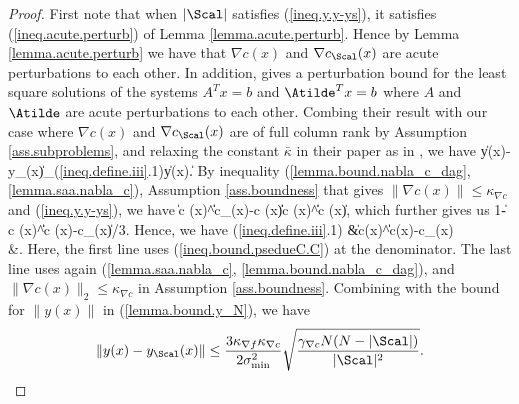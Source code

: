 \begin{proof}
First note that when $|\Scal|$ satisfies (\ref{ineq.y.y-ys}), it satisfies (\ref{ineq.acute.perturb}) of Lemma \ref{lemma.acute.perturb}. Hence by Lemma \ref{lemma.acute.perturb} we have that $\nabla c (x)$ and $\nabla c_\Scal(x)$ are acute perturbations to each other. In addition, \cite[Theorem 5.2]{396bf6e1-ef54-3bf6-a49b-862db8404076} gives a perturbation bound for the least square solutions of the systems $A^Tx=b$ and $\Atilde^T x=b$ where $A$ and $\Atilde$ are acute perturbations to each other. Combing their result with our case where $\nabla c(x)$ and $\nabla c_\Scal(x)$ are of full column rank by Assumption \ref{ass.subproblems}, and relaxing the constant $\bar{\kappa}$ in their paper as in \cite[Corollary 3.9]{396bf6e1-ef54-3bf6-a49b-862db8404076}, we have
\bequation
\label{ineq.define.iii}
	\|y(x)-y_\Scal(x)\|
	\le {}_{(\ref{ineq.define.iii}.1)}\|y(x)\|.
\eequation
	By inequality (\ref{lemma.bound.nabla_c_dag},\ref{lemma.saa.nabla_c}), Assumption \ref{ass.boundness} that gives $\|\nabla c(x)\|\le\kappa_{\nabla c}$ and (\ref{ineq.y.y-ys}), we have
	\bequationNN
	\|\nabla c (x)^\dag\|\|\nabla c_\Scal(x)-\nabla c (x)\|
	\le{}\|\nabla c (x)^\dag\|\|\nabla c (x)\|\le {},
	\eequationNN
which further gives us
	\bequation
	\label{ineq.bound.psedueC.C}
		1-\|\nabla c (x)^\dag\|\|\nabla c (x)-\nabla c_\Scal(x)\|/3.
	\eequation
	Hence, we have
	\bequationNN
	\label{ineq.bound.psi}
	\baligned
	(\ref{ineq.define.iii}.1)
	&\le {}\|\nabla c(x)^\dag\|\|\nabla c(x)-\nabla c_\Scal(x)\|\\
	&\le {}.
\ealigned
\eequationNN
Here, the first line uses (\ref{ineq.bound.psedueC.C}) at the denominator. The last line uses again (\ref{lemma.saa.nabla_c}, \ref{lemma.bound.nabla_c_dag}), and $\|\nabla c(x)\|_2\le\kappa_{\nabla c}$ in Assumption \ref{ass.boundness}.  Combining with the bound for $\|y(x)\|$ in (\ref{lemma.bound.y_N}), we have
	\[
	\|y(x)-y_\Scal(x)\|
	 \le \frac{3\kappa_{\nabla f}\kappa_{\nabla c}}{2 \sigma_{\min}^2}\sqrt{ \frac{\gamma_{\nabla c} N(N-|\Scal|)}{|\Scal|^2}}.
	\]
	

\end{proof}
